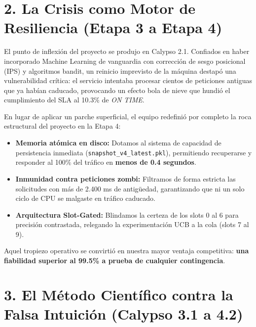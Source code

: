 \documentclass[11pt,a4paper]{article}
\begin{document}
\section{2. La Crisis como Motor de Resiliencia (Etapa 3 a Etapa 4)}

El punto de inflexión del proyecto se produjo en Calypso 2.1. Confiados en haber incorporado Machine Learning de vanguardia con corrección de sesgo posicional (IPS) y algoritmos bandit, un reinicio imprevisto de la máquina destapó una vulnerabilidad crítica: el servicio intentaba procesar cientos de peticiones antiguas que ya habían caducado, provocando un efecto bola de nieve que hundió el cumplimiento del SLA al 10.3\% de \textit{ON TIME}.

En lugar de aplicar un parche superficial, el equipo redefinió por completo la roca estructural del proyecto en la Etapa 4:
\begin{itemize}[noitemsep]
    \item \textbf{Memoria atómica en disco:} Dotamos al sistema de capacidad de persistencia inmediata (\texttt{snapshot\_v4\_latest.pkl}), permitiendo recuperarse y responder al 100\% del tráfico en \textbf{menos de 0.4 segundos}.
    \item \textbf{Inmunidad contra peticiones zombi:} Filtramos de forma estricta las solicitudes con más de 2.400 ms de antigüedad, garantizando que ni un solo ciclo de CPU se malgaste en tráfico caducado.
    \item \textbf{Arquitectura Slot-Gated:} Blindamos la certeza de los slots 0 al 6 para precisión contrastada, relegando la experimentación UCB a la cola (slots 7 al 9).
\end{itemize}
Aquel tropiezo operativo se convirtió en nuestra mayor ventaja competitiva: \textbf{una fiabilidad superior al 99.5\% a prueba de cualquier contingencia}.

\section{3. El Método Científico contra la Falsa Intuición (Calypso 3.1 a 4.2)}
\end{document}
